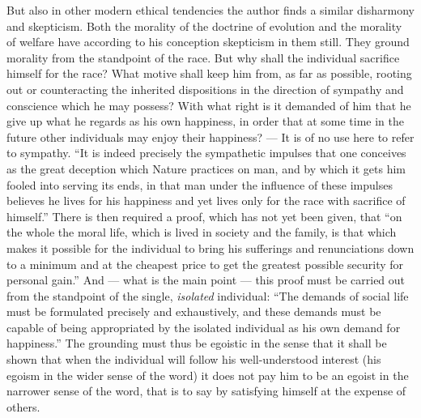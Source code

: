 \documentclass[12pt,a4paper,openany]{book}
\newcommand{\opage}[1]{\marginnote{\footnotesize\textit{[#1]}}}
\begin{document}
But also in other modern ethical tendencies the author finds
a similar disharmony and skepticism. Both
the morality of the doctrine of evolution and the morality of welfare have according to his
\opage{32}conception skepticism in them still. They ground morality from
the standpoint of the race. But why shall the individual sacrifice himself
for the race? What motive shall keep him from, as far as
possible, rooting out or counteracting the inherited dispositions in
the direction of sympathy and conscience which he may possess?
With what right is it demanded of him that he give up what
he regards as his own happiness, in order that at some time in the future
other individuals may enjoy their happiness? --- It is of no use
here to refer to sympathy. ``It is indeed precisely the
sympathetic impulses that one conceives as the great deception
which Nature practices on man, and by which it gets
him fooled into serving its ends, in that man under the
influence of these impulses believes he lives for his happiness
and yet lives only for the race with sacrifice of himself.''
There is then required a proof, which has not yet been given, that ``on
the whole the moral life, which is lived in society
and the family, is that which makes it possible for the individual to bring
his sufferings and renunciations down to a minimum and at the
cheapest price to get the greatest possible security for
personal gain.'' And --- what is the main point --- this
proof must be carried out from the standpoint of the single, \emph{isolated} individual:
``The demands of social life must be formulated
precisely and exhaustively, and these demands must be capable of being appropriated
by the isolated individual as his own demand for happiness.''
The grounding must thus be egoistic in the sense that it
shall be shown that when the individual will follow his well-understood
interest (his egoism in the wider sense of the word) it
does not pay him to be an egoist in the narrower
sense of the word, that is to say by satisfying himself at the expense of
others.
\end{document}
